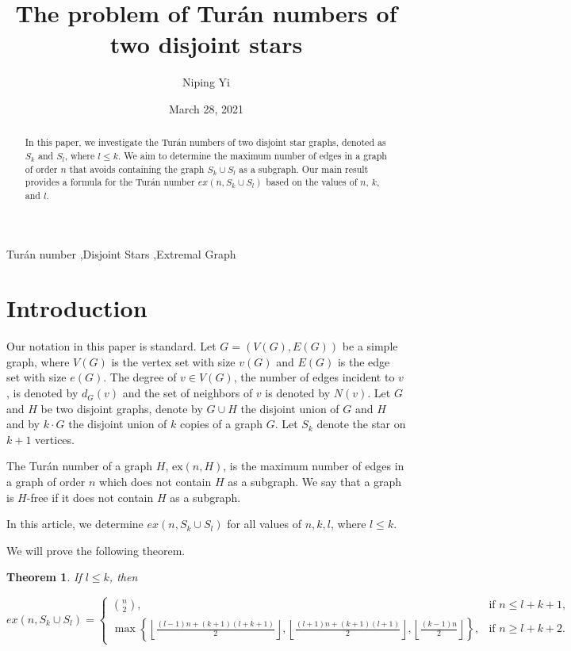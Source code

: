 \documentclass[12pt]{elsarticle}
\newtheorem{theorem}{Theorem}
\begin{document}
\begin{frontmatter}

\title{The problem of Turán numbers of two disjoint stars }

\author{Niping Yi}
\date{March 28, 2021}


\begin{abstract}
    In this paper, we investigate the Turán numbers of two disjoint star graphs, denoted as \( S_k \) and \( S_l \), where \( l \le k \). We aim to determine the maximum number of edges in a graph of order \( n \) that avoids containing the graph \( S_k \cup S_l \) as a subgraph. Our main result provides a formula for the Turán number \( ex(n, S_k \cup S_l) \) based on the values of \( n \), \( k \), and \( l \).  
    \end{abstract}

\begin{keyword}
Turán number \sep Disjoint Stars \sep Extremal Graph
\end{keyword}

\end{frontmatter}

\section{Introduction}
Our notation in this paper is standard. Let \( G = (V(G), E(G)) \) be a simple graph, where \( V(G) \) is the vertex set with size \( v(G) \) and \( E(G) \) is the edge set with size \( e(G) \). The degree of \( v \in V(G) \), the number of edges incident to \( v \), is denoted by \( d_G(v) \) and the set of neighbors of \( v \) is denoted by \( N(v) \).  Let \( G \) and \( H \) be two disjoint graphs, denote by \( G \cup H \) the disjoint union of \( G \) and \( H \) and by \( k \cdot G \) the disjoint union of \( k \) copies of a graph \( G \). Let \( S_k \) denote the star on \( k + 1 \) vertices. 

The Turán number of a graph \( H \), \( \text{ex}(n, H) \), is the maximum number of edges in a graph of order \( n \) which does not contain \( H \) as a subgraph. We say that a graph is \( H \)-free if it does not contain \( H \) as a subgraph.

In this article, we determine \( ex(n, S_k \cup S_l) \) for all values of \( n, k, l \), where \( l \le k \).


We will prove the following theorem.

\begin{theorem}\label{thm1}
    If $l \le k$, then
    \begin{footnotesize}
    \[
    ex(n, S_{k} \cup S_{l}) = 
    \begin{cases} 
    \binom{n}{2}, & \text{if } n \le l + k + 1, \\
    \max\left\{\left\lfloor \frac{(l-1)n+(k+1)(l+k+1)}{2} \right\rfloor, \left\lfloor \frac{(l+1)n+(k+1)(l+1)}{2} \right\rfloor, \left\lfloor \frac{(k-1)n}{2} \right\rfloor\right\}, & \text{if } n \ge l + k + 2.
    \end{cases}
    \]
\end{footnotesize}
    \end{theorem}
\end{document}
